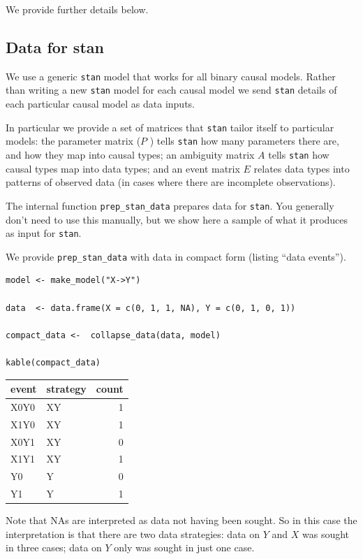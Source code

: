 \documentclass[
  article]{jss}
\begin{document}
We provide further details below.

\hypertarget{data-for-stan}{%
\subsection{Data for stan}\label{data-for-stan}}

We use a generic \texttt{stan} model that works for all binary causal
models. Rather than writing a new \texttt{stan} model for each causal
model we send \texttt{stan} details of each particular causal model as
data inputs.

In particular we provide a set of matrices that \texttt{stan} tailor
itself to particular models: the parameter matrix (\(P\) ) tells
\texttt{stan} how many parameters there are, and how they map into
causal types; an ambiguity matrix \(A\) tells \texttt{stan} how causal
types map into data types; and an event matrix \(E\) relates data types
into patterns of observed data (in cases where there are incomplete
observations).

The internal function \texttt{prep\_stan\_data} prepares data for
\texttt{stan}. You generally don't need to use this manually, but we
show here a sample of what it produces as input for \texttt{stan}.

We provide \texttt{prep\_stan\_data} with data in compact form (listing
``data events'').

\begin{verbatim}
model <- make_model("X->Y")

data  <- data.frame(X = c(0, 1, 1, NA), Y = c(0, 1, 0, 1)) 

compact_data <-  collapse_data(data, model) 

kable(compact_data)
\end{verbatim}

\begin{longtable}[]{@{}llr@{}}
\toprule\noalign{}
event & strategy & count \\
\midrule\noalign{}
\endhead
\bottomrule\noalign{}
\endlastfoot
X0Y0 & XY & 1 \\
X1Y0 & XY & 1 \\
X0Y1 & XY & 0 \\
X1Y1 & XY & 1 \\
Y0 & Y & 0 \\
Y1 & Y & 1 \\
\end{longtable}

Note that NAs are interpreted as data not having been sought. So in this
case the interpretation is that there are two data strategies: data on
\(Y\) and \(X\) was sought in three cases; data on \(Y\) only was sought
in just one case.
\end{document}
